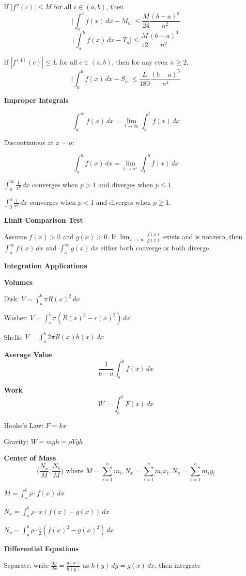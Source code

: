 \documentclass[10pt]{article}
\newcommand\sectionheading[1]{\begin{center}\large{\textbf{#1}}\end{center}\normalsize}
\newcommand\heading[1]{\smallskip\textbf{#1}\smallskip}
\begin{document}
\begin{multicols*}{3}
If $|f''(c)|\leq M$ for all $c\in(a,b)$, then 
\[\biggl|\int_{a}^{b}f(x)\,dx-M_n\biggr|\leq\frac{M}{24}\frac{(b-a)^3}{n^2}\]
\[\biggl|\int_{a}^{b}f(x)\,dx-T_n\biggr|\leq\frac{M}{12}\frac{(b-a)^3}{n^2}\]

If $|f^{(4)}(c)|\leq L$ for all $c\in(a,b)$, then for any even $n\geq 2$,
\[\biggl|\int_{a}^{b}f(x)\,dx-S_n\biggr|\leq\frac{L}{180}\frac{(b-a)^5}{n^4}\]

\sectionheading{Improper Integrals}
\[\int_{a}^{\infty}f(x)\,dx=\lim_{t\to\infty}\int_{a}^{t}f(x)\,dx\]

Discontinuous at $x=a$:

\[\int_{a}^{b}f(x)\,dx=\lim_{t\to a^+}\int_{t}^{b}f(x)\,dx\]

$\displaystyle\int_a^\infty\frac{1}{x^p}\,dx$ converges when $p>1$ and diverges when $p\leq 1$.

$\displaystyle\int_0^{a}\frac{1}{x^p}\,dx$ converges when $p< 1$ and diverges when $p\geq 1$.

\heading{Limit Comparison Test}

Assume $f(x)>0$ and $g(x)>0$. If $\lim_{x\to\infty}\frac{f(x)}{g(x)}$ exists and is nonzero, then $\int_{a}^{\infty}f(x)\,dx$ and $\int_{a}^{\infty} g(x)\,dx$ either both converge or both diverge. 

\sectionheading{Integration Applications}

\heading{Volumes}

Disk: $V=\int_{a}^{b}\pi R(x)^2\,dx$

Washer: $V=\int_{a}^{b}\pi(R(x)^2-r(x)^2)\,dx$

Shells: $V=\int_{a}^{b}2\pi R(x) h(x)\,dx$

\heading{Average Value}
\[\frac{1}{b-a}\int_{a}^{b}f(x)\,dx\]

\heading{Work}
\[W=\int_a^b F(x)\,dx\]

Hooke's Law: $F=kx$

Gravity: $W=mgh=\rho Vgh$

\heading{Center of Mass}
{\small
\[\biggl(\frac{N_x}{M},\frac{N_y}{M}\biggr) \text{ where } M=\sum_{i=1}^n m_i, N_x=\sum_{i=1}^n m_i x_i, N_y=\sum_{i=1}^n m_i y_i\]}

$M=\int_a^b \rho\cdot f(x)\,dx$

$N_x=\int_a^b \rho\cdot x(f(x)-g(x))\,dx$

$N_y=\int_a^b \rho\cdot\frac12 (f(x)^2-g(x)^2)\,dx$

\sectionheading{Differential Equations}

Separate: write $\frac{dy}{dx}=\frac{g(x)}{h(y)}$ as $h(y)\,dy=g(x)\,dx$, then integrate


\end{multicols*}
\end{document}
